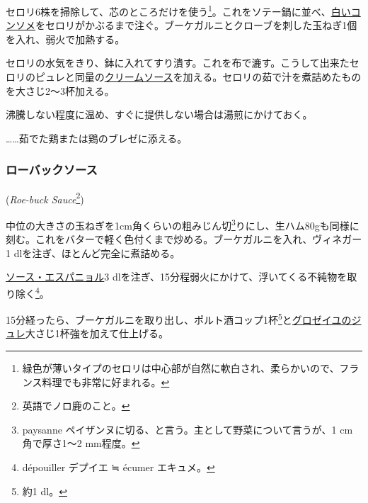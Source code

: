 \begin{recette}
セロリ6株を掃除して、芯のところだけを使う\footnote{緑色が薄いタイプのセロリは中心部が自然に軟白され、柔らかいので、フランス料理でも非常に好まれる。}。これをソテー鍋に並べ、\protect\hyperlink{}{白いコンソメ}をセロリがかぶるまで注ぐ。ブーケガルニとクローブを刺した玉ねぎ1個を入れ、弱火で加熱する。

セロリの水気をきり、鉢に入れてすり潰す。これを布で漉す。こうして出来たセロリのピュレと同量の\protect\hyperlink{cream-sauce}{クリームソース}を加える。セロリの茹で汁を煮詰めたものを大さじ2〜3杯加える。

沸騰しない程度に温め、すぐに提供しない場合は湯煎にかけておく。

\ldots{}\ldots{}茹でた鶏または鶏のブレゼに添える。

\maeaki

\hypertarget{roe-buck-sauce}{%
\subsubsection{ローバックソース}\label{roe-buck-sauce}}

 (\emph{Roe-buck Sauce}\footnote{英語でノロ鹿のこと。})


中位の大きさの玉ねぎを1cm角くらいの粗みじん切\footnote{paysanne
  ペイザンヌに切る、と言う。主として野菜について言うが、1 cm角で厚さ1〜2
  mm程度。}りにし、生ハム80gも同様に刻む。これをバターで軽く色付くまで炒める。ブーケガルニを入れ、ヴィネガー1\undemi{}
dlを注ぎ、ほとんど完全に煮詰める。

\protect\hyperlink{sauce-espagnole}{ソース・エスパニョル}3
dlを注ぎ、15分程弱火にかけて、浮いてくる不純物を取り除く\footnote{dépouiller
  デプイエ ≒ écumer エキュメ。}。

15分経ったら、ブーケガルニを取り出し、ポルト酒コップ1杯\footnote{約1
  dl。}と\protect\hyperlink{}{グロゼイユのジュレ}大さじ1杯強を加えて仕上げる。


\end{recette}
